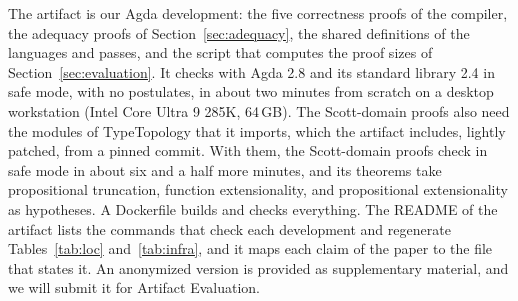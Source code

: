 \documentclass[acmsmall,screen,review,anonymous,nonacm]{acmart}
\begin{document}
The artifact is our Agda development: the five correctness proofs of the
compiler, the adequacy proofs of Section~\ref{sec:adequacy}, the shared
definitions of the languages and passes, and the script that computes
the proof sizes of Section~\ref{sec:evaluation}. It checks with Agda
2.8 and its standard library 2.4 in safe mode, with no postulates, in
about two minutes from scratch on a desktop workstation (Intel Core Ultra 9 285K,
64\,GB). The Scott-domain proofs also need the modules of TypeTopology that it imports, which the artifact includes, lightly patched, from a pinned commit. With them, the Scott-domain proofs check in safe mode in about six and a half more minutes, and its theorems take propositional truncation, function extensionality, and propositional extensionality as hypotheses. A Dockerfile builds and checks everything. The README of the artifact
lists the commands that check each development and regenerate
Tables~\ref{tab:loc} and~\ref{tab:infra}, and it maps each claim of the paper
to the file that states it. An anonymized version is provided as
supplementary material, and we will submit it for Artifact Evaluation.




\pagebreak


\end{document}
